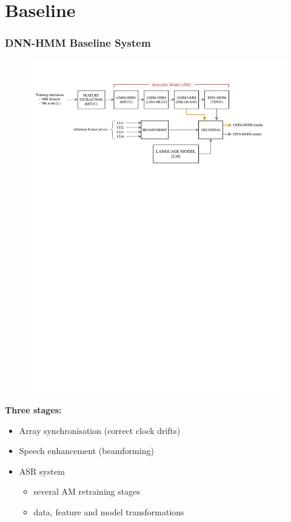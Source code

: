 \documentclass{beamer}
\begin{document}
\section{Baseline}
\begin{frame}
  \frametitle{DNN-HMM Baseline System}
  
  \begin{figure}
  \centering
  \includegraphics[width=\textwidth]{img/conv_baseline_sketch}
  \end{figure}  

  \vspace{-.5em}  
  \begin{minipage}[bt]{.7\textwidth}
    \textbf{Three stages: }  

    \begin{itemize}
    \item Array synchronisation (correct clock drifts)
    \item Speech enhancement (beamforming)
    \item ASR system 
      \begin{itemize}
      \item several AM retraining stages
      \item data, feature and model transformations
      \end{itemize}
    \end{itemize}
    

\end{minipage}
\end{frame}
\end{document}
